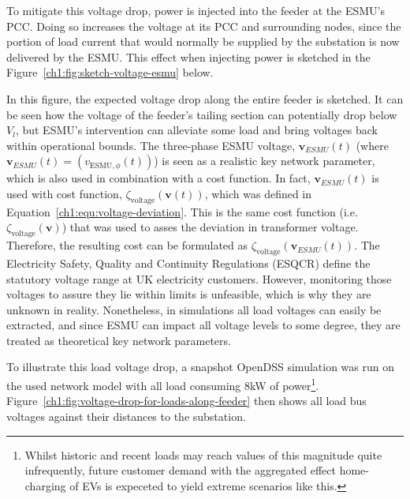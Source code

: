 To mitigate this voltage drop, power is injected into the feeder at the ESMU's PCC.
Doing so increases the voltage at its PCC and surrounding nodes, since the portion of load current that would normally be supplied by the substation is now delivered by the ESMU.
This effect when injecting power is sketched in the Figure~\ref{ch1:fig:sketch-voltage-esmu} below.




In this figure, the expected voltage drop along the entire feeder is sketched. 
It can be seen how the voltage of the feeder's tailing section can potentially drop below $V_l$, but ESMU's intervention can alleviate some load and bring voltages back within operational bounds.
The three-phase ESMU voltage, $\textbf{v}_{ESMU}(t)$ (where $\textbf{v}_{ESMU}(t) = (v_{\text{ESMU},\phi}(t))$) is seen as a realistic key network parameter, which is also used in combination with a cost function.
In fact, $\textbf{v}_{ESMU}(t)$ is used with cost function, $\zeta_\text{voltage}(\textbf{v}(t))$, which was defined in Equation~\ref{ch1:equ:voltage-deviation}.
This is the same cost function (i.e. $\zeta_\text{voltage}(\textbf{v})$) that was used to asses the deviation in transformer voltage.
Therefore, the resulting cost can be formulated as $\zeta_\text{voltage}(\textbf{v}_{ESMU}(t))$.
The Electricity Safety, Quality and Continuity Regulations (ESQCR) define the statutory voltage range at UK electricity customers.
However, monitoring those voltages to assure they lie within limits is unfeasible, which is why they are unknown in reality.
Nonetheless, in simulations all load voltages can easily be extracted, and since ESMU can impact all voltage levels to some degree, they are treated as theoretical key network parameters.

To illustrate this load voltage drop, a snapshot OpenDSS simulation was run on the used network model with all load consuming  8kW of power\footnote{Whilst historic and recent loads may reach values of this magnitude quite infrequently, future customer demand with the aggregated effect home-charging of EVs is expeceted to yield extreme scenarios like this.}.
Figure~\ref{ch1:fig:voltage-drop-for-loads-along-feeder} then shows all load bus voltages against their distances to the substation.


